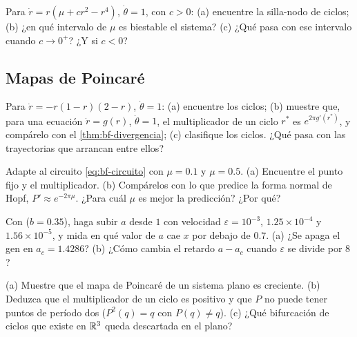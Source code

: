 \begin{problema}\label{prob:bf-quintica}
Para $\dot r=r(\mu+cr^2-r^4)$, $\dot\theta=1$, con $c>0$: (a) encuentre la silla-nodo de ciclos; (b) ¿en qué intervalo de $\mu$ es biestable el sistema? (c) ¿Qué pasa con ese intervalo cuando $c\to0^+$? ¿Y si $c<0$?
\end{problema}

\subsection*{Mapas de Poincaré}

\begin{problema}\label{prob:bf-dosciclos}
Para $\dot r=-r(1-r)(2-r)$, $\dot\theta=1$: (a) encuentre los ciclos; (b) muestre que, para una ecuación $\dot r=g(r)$, $\dot\theta=1$, el multiplicador de un ciclo $r^*$ es $e^{2\pi g'(r^*)}$, y compárelo con el \cref{thm:bf-divergencia}; (c) clasifique los ciclos. ¿Qué pasa con las trayectorias que arrancan entre ellos?
\end{problema}

\begin{problema}\label{prob:bf-mapacircuito}
\etiquetaM{} Adapte  al circuito \eqref{eq:bf-circuito} con $\mu=0.1$ y $\mu=0.5$. (a) Encuentre el punto fijo y el multiplicador. (b) Compárelos con lo que predice la forma normal de Hopf, $P'\approx e^{-2\pi\mu}$. ¿Para cuál $\mu$ es mejor la predicción? ¿Por qué?
\end{problema}

\begin{problema}\label{prob:bf-retardo}
\etiquetaM{} Con  ($b=0.35$), haga subir $a$ desde $1$ con velocidad $\varepsilon=10^{-3}$, $1.25\times10^{-4}$ y $1.56\times10^{-5}$, y mida en qué valor de $a$ cae $x$ por debajo de $0.7$. (a) ¿Se apaga el gen en $a_c=1.4286$? (b) ¿Cómo cambia el retardo $a-a_c$ cuando $\varepsilon$ se divide por $8$?
\end{problema}

\begin{problema}\label{prob:bf-plano}
\etiquetaEstrella{} (a) Muestre que el mapa de Poincaré de un sistema plano es creciente. (b) Deduzca que el multiplicador de un ciclo es positivo y que $P$ no puede tener puntos de período dos ($P^2(q)=q$ con $P(q)\neq q$). (c) ¿Qué bifurcación de ciclos que existe en $\mathbb{R}^3$ queda descartada en el plano?
\end{problema}

